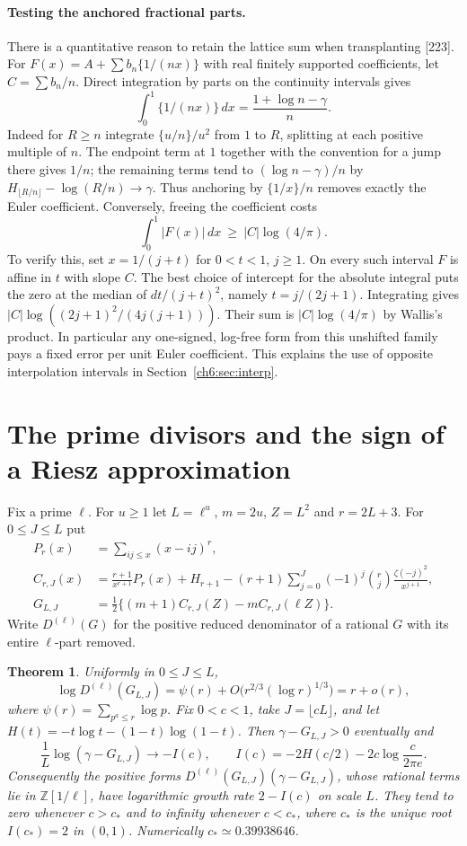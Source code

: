 \documentclass[11pt,a4paper,oneside,openany]{report}
\newtheorem{theorem}{Theorem}[section]
\theoremstyle{remark}\newtheorem{remark}[theorem]{Remark}
\numberwithin{equation}{section}
\begin{document}
\paragraph{Testing the anchored fractional parts.}
There is a quantitative reason to retain the lattice sum when transplanting [223]. For $F(x)=A+\sum b_n\{1/(nx)\}$ with real finitely supported coefficients, let $C=\sum b_n/n$. Direct integration by parts on the continuity intervals gives
\[
 \int_0^1\{1/(nx)\}\,dx=\frac{1+\log n-\gamma}{n}.
\]
Indeed for $R\ge n$ integrate $\{u/n\}/u^2$ from $1$ to $R$, splitting at each positive multiple of $n$. The endpoint term at $1$ together with the convention for a jump there gives $1/n$; the remaining terms tend to $(\log n-\gamma)/n$ by $H_{\lfloor R/n\rfloor}-\log(R/n)\to\gamma$. Thus anchoring by $\{1/x\}/n$ removes exactly the Euler coefficient. Conversely, freeing the coefficient costs
\[
                  \int_0^1|F(x)|\,dx\ \ge\ |C|\log(4/\pi).
\]
To verify this, set $x=1/(j+t)$ for $0<t<1$, $j\ge1$. On every such interval $F$ is affine in $t$ with slope $C$. The best choice of intercept for the absolute integral puts the zero at the median of $dt/(j+t)^2$, namely $t=j/(2j+1)$. Integrating gives $|C|\log((2j+1)^2/(4j(j+1)))$. Their sum is $|C|\log(4/\pi)$ by Wallis's product. In particular any one-signed, log-free form from this unshifted family pays a fixed error per unit Euler coefficient. This explains the use of opposite interpolation intervals in Section~\ref{ch6:sec:interp}.

\section{The prime divisors and the sign of a Riesz approximation}
\label{ch6:rl:section}
Fix a prime $\ell$. For $u\ge1$ let $L=\ell^u$, $m=2u$, $Z=L^2$ and
$r=2L+3$. For $0\le J\le L$ put
\begin{align*}
 P_r(x)&=\sum_{ij\le x}(x-ij)^r,\\
 C_{r,J}(x)&=\frac{r+1}{x^{r+1}}P_r(x)+H_{r+1}
  -(r+1)\sum_{j=0}^J(-1)^j\binom rj\frac{\zeta(-j)^2}{x^{j+1}},\\
 G_{L,J}&=\tfrac12\{(m+1)C_{r,J}(Z)-mC_{r,J}(\ell Z)\}.
\end{align*}
Write $D^{(\ell)}(G)$ for the positive reduced denominator of a
rational $G$ with its entire $\ell$-part removed.

\begin{theorem}\label{ch6:rl:thm}
Uniformly in $0\le J\le L$,
\[
   \log D^{(\ell)}(G_{L,J})
       =\psi(r)+O\big(r^{2/3}(\log r)^{1/3}\big)=r+o(r),
\]
where $\psi(r)=\sum_{p^a\le r}\log p$. Fix $0<c<1$, take $J=\lfloor cL\rfloor$, and let
$H(t)=-t\log t-(1-t)\log(1-t)$. Then $\gamma-G_{L,J}>0$ eventually and
\[
 \frac1L\log(\gamma-G_{L,J})\longrightarrow-I(c),\qquad
 I(c)=-2H(c/2)-2c\log\frac{c}{2\pi e}.
\]
Consequently the positive forms $D^{(\ell)}(G_{L,J})(\gamma-G_{L,J})$,
whose rational terms lie in $\mathbb Z[1/\ell]$, have logarithmic
growth rate $2-I(c)$ on scale $L$. They tend to zero whenever
$c>c_*$ and to infinity whenever $c<c_*$, where $c_*$ is the unique
root $I(c_*)=2$ in $(0,1)$. Numerically $c_*\simeq0.39938646$.
\end{theorem}
\end{document}
